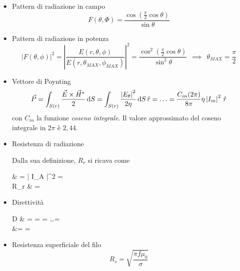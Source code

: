 \begin{itemize}
	\item Pattern di radiazione in campo
	\begin{equation}
		F(\theta, \Phi) = \frac{\cos \left(\frac{\pi}{2} \cos \theta \right)}{\sin \theta}
	\end{equation}

	\item Pattern di radiazione in potenza
	\begin{equation}
		\left | F(\theta, \phi) \right |^2 = \left | \frac{E(r, \theta, \phi)}{E(r, \theta_{MAX}, \phi_{MAX})} \right |^2 = \frac{\cos^2 \left(\frac{\pi}{2} \cos \theta \right)}{\sin^2 \theta}
		~~ \implies ~~
		\theta_{MAX} = \frac{\pi}{2}
	\end{equation}

	\item Vettore di Poynting
	\begin{equation}
		\vec{P}
		= \int_{S(r)} \frac{\vec{E} \times \vec{H}^*}{2} \mathop{}\!\mathrm{d} S
		= \int_{S(r)} \frac{\left | E_{\theta} \right |^2}{2 \eta} \mathop{}\!\mathrm{d} S \,\hat{r}
		= \ldots = \frac{C_{in} (2 \pi)}{8 \pi} \eta \left | I_m \right |^2 \,\hat{r}
	\end{equation}
	con $C_{in}$ la funzione \emph{coseno integrale}.
	Il valore approssimato del coseno integrale in $2\pi$ è $2,44$.

	\item Resistenza di radiazione

	Dalla sua definizione, $R_r$ si ricava come
	\begin{esp*}
		& =  \eta \left | I_A \right |^2
		=  \\
		R_r
		& =  \eta {} \Omega
	\end{esp*}

	\item Direttività
	\begin{esp}
		D
		& = 
		= 
		= \ldots = \\
		&=  =  
	\end{esp}

	\item Resistenza superficiale del filo
	\begin{equation}
		R_s = \sqrt{\frac{\pi f \mu_0}{\sigma}}
	\end{equation}


\end{itemize}
